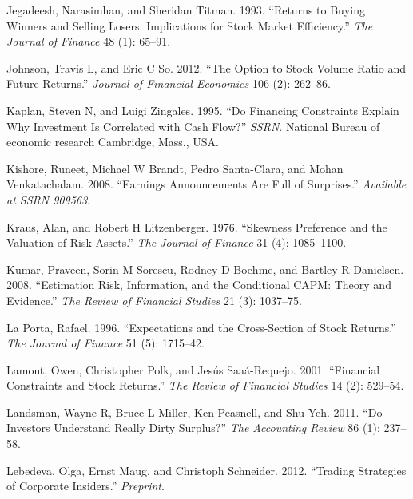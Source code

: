 \documentclass[
  letterpaper,
  DIV=11,
  numbers=noendperiod]{scrreprt}
\newlength{\cslhangindent}
\newlength{\cslentryspacingunit} %
\newenvironment{CSLReferences}[2] %
 {%
  \setlength{\parindent}{0pt}
  \ifodd #1
  \let\oldpar\par
  \def\par{\hangindent=\cslhangindent\oldpar}
  \fi
  \setlength{\parskip}{#2\cslentryspacingunit}
 }%
 {}
\begin{document}
\begin{CSLReferences}{1}{0}
\leavevmode{}%
Jegadeesh, Narasimhan, and Sheridan Titman. 1993. {``Returns to Buying
Winners and Selling Losers: Implications for Stock Market Efficiency.''}
\emph{The Journal of Finance} 48 (1): 65--91.

\leavevmode{}%
Johnson, Travis L, and Eric C So. 2012. {``The Option to Stock Volume
Ratio and Future Returns.''} \emph{Journal of Financial Economics} 106
(2): 262--86.

\leavevmode{}%
Kaplan, Steven N, and Luigi Zingales. 1995. {``Do Financing Constraints
Explain Why Investment Is Correlated with Cash Flow?''} \emph{SSRN}.
National Bureau of economic research Cambridge, Mass., USA.

\leavevmode{}%
Kishore, Runeet, Michael W Brandt, Pedro Santa-Clara, and Mohan
Venkatachalam. 2008. {``Earnings Announcements Are Full of Surprises.''}
\emph{Available at SSRN 909563}.

\leavevmode{}%
Kraus, Alan, and Robert H Litzenberger. 1976. {``Skewness Preference and
the Valuation of Risk Assets.''} \emph{The Journal of Finance} 31 (4):
1085--1100.

\leavevmode{}%
Kumar, Praveen, Sorin M Sorescu, Rodney D Boehme, and Bartley R
Danielsen. 2008. {``Estimation Risk, Information, and the Conditional
CAPM: Theory and Evidence.''} \emph{The Review of Financial Studies} 21
(3): 1037--75.

\leavevmode{}%
La Porta, Rafael. 1996. {``Expectations and the Cross-Section of Stock
Returns.''} \emph{The Journal of Finance} 51 (5): 1715--42.

\leavevmode{}%
Lamont, Owen, Christopher Polk, and Jesús Saaá-Requejo. 2001.
{``Financial Constraints and Stock Returns.''} \emph{The Review of
Financial Studies} 14 (2): 529--54.

\leavevmode{}%
Landsman, Wayne R, Bruce L Miller, Ken Peasnell, and Shu Yeh. 2011.
{``Do Investors Understand Really Dirty Surplus?''} \emph{The Accounting
Review} 86 (1): 237--58.

\leavevmode{}%
Lebedeva, Olga, Ernst Maug, and Christoph Schneider. 2012. {``Trading
Strategies of Corporate Insiders.''} \emph{Preprint}.


\end{CSLReferences}
\end{document}
